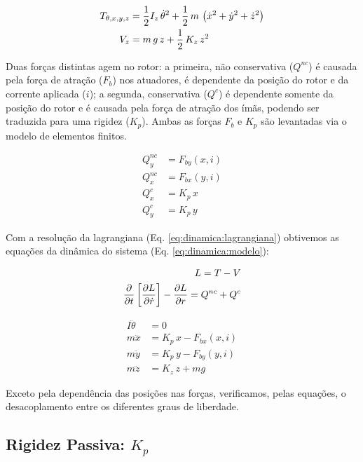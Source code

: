  \begin{align}
 	T_{\theta, x, y, z} &= \frac{1}{2} I_z \, \dot{\theta}^2 + \frac{1}{2} \, m \, \left( \dot{x}^2 + \dot{y}^2 + \dot{z}^2 \right) \notag \\
 	V_z &= m \, g \, z + \frac{1}{2} \, K_z \, z^2
 \end{align}	
 	
 Duas forças distintas agem no rotor: a primeira, não conservativa ($Q^{nc}$) é causada pela força de atração ($F_b$) nos atuadores, é dependente da posição do rotor e da corrente aplicada ($i$); a segunda, conservativa ($Q^{c}$) é dependente somente da posição do rotor e é causada pela força de atração dos ímãs, podendo ser traduzida para uma rigidez ($K_p$). Ambas as forças $F_b$ e $K_p$ são levantadas via o modelo de elementos finitos. 
	 	
 \begin{align}
 	Q_y^{nc} &= F_{by}(x,i)  \\
 	Q_x^{nc} &= F_{bx}(y,i)  \\
 	Q^{c}_x  &= K_p \, x \\
 	Q^{c}_y  &= K_p \, y 
 \end{align}
  
  Com a resolução da lagrangiana (Eq. \ref{eq:dinamica:lagrangiana}) obtivemos as equações da dinâmica do sistema (Eq. \ref{eq:dinamica:modelo}):
  
   \begin{align}
   		L = T - V \notag \\
   		\frac{\partial}{\partial t} \left[ \frac{\partial L}{\partial \dot{r}} \right] -  \frac{\partial L}{\partial r} = Q^{nc} + Q^{c}
   		\label{eq:dinamica:lagrangiana}
   \end{align}
  
 	\begin{align}
 	I \ddot{\theta} &= 0 \\
 	m \ddot{x}		&= K_p \, x  - F_{bx}(x,i) \\
 	m \ddot{y}		&= K_p \, y  - F_{by}(y,i) \label{eq:dinamica:rotor:radial}\\	
 	m \ddot{z}  	&= K_z \, z + m g 
 	\label{eq:dinamica:modelo}
 	\end{align}	
 
 Exceto pela dependência das posições nas forças, verificamos, pelas equações, o desacoplamento entre os diferentes graus de liberdade. 

\subsection{Rigidez Passiva: $K_p$}

